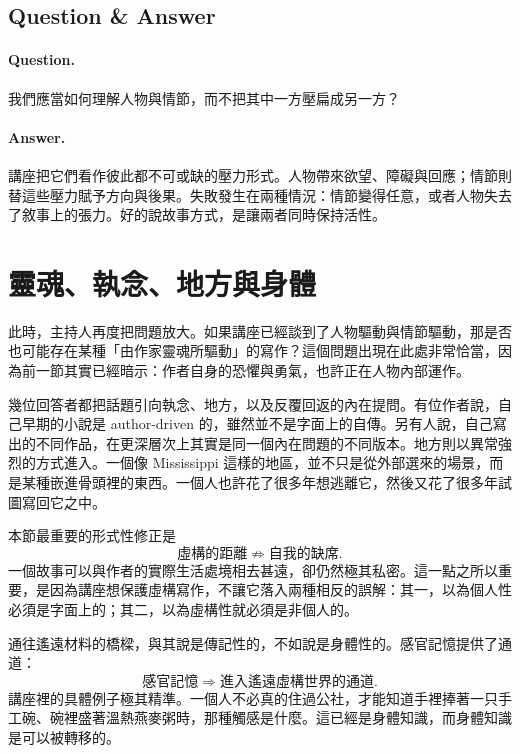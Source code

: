 \subsection{Question \& Answer}

\paragraph{Question.} 我們應當如何理解人物與情節，而不把其中一方壓扁成另一方？

\paragraph{Answer.} 講座把它們看作彼此都不可或缺的壓力形式。人物帶來欲望、障礙與回應；情節則替這些壓力賦予方向與後果。失敗發生在兩種情況：情節變得任意，或者人物失去了敘事上的張力。好的說故事方式，是讓兩者同時保持活性。

\section{靈魂、執念、地方與身體}

此時，主持人再度把問題放大。如果講座已經談到了人物驅動與情節驅動，那是否也可能存在某種「由作家靈魂所驅動」的寫作？這個問題出現在此處非常恰當，因為前一節其實已經暗示：作者自身的恐懼與勇氣，也許正在人物內部運作。

幾位回答者都把話題引向執念、地方，以及反覆回返的內在提問。有位作者說，自己早期的小說是 author-driven 的，雖然並不是字面上的自傳。另有人說，自己寫出的不同作品，在更深層次上其實是同一個內在問題的不同版本。地方則以異常強烈的方式進入。一個像 Mississippi 這樣的地區，並不只是從外部選來的場景，而是某種嵌進骨頭裡的東西。一個人也許花了很多年想逃離它，然後又花了很多年試圖寫回它之中。

本節最重要的形式性修正是
\begin{equation}
\text{虛構的距離} \not\Rightarrow \text{自我的缺席}.
\end{equation}
一個故事可以與作者的實際生活處境相去甚遠，卻仍然極其私密。這一點之所以重要，是因為講座想保護虛構寫作，不讓它落入兩種相反的誤解：其一，以為個人性必須是字面上的；其二，以為虛構性就必須是非個人的。

通往遙遠材料的橋樑，與其說是傳記性的，不如說是身體性的。感官記憶提供了通道：
\begin{equation}
\text{感官記憶} \Rightarrow \text{進入遙遠虛構世界的通道}.
\end{equation}
講座裡的具體例子極其精準。一個人不必真的住過公社，才能知道手裡捧著一只手工碗、碗裡盛著溫熱燕麥粥時，那種觸感是什麼。這已經是身體知識，而身體知識是可以被轉移的。

